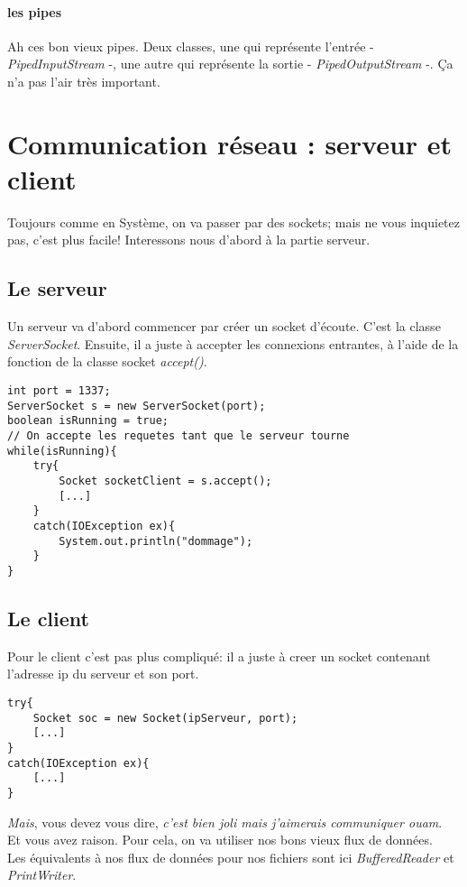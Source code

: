 \documentclass{article}
\begin{document}
\paragraph{les pipes}
Ah ces bon vieux pipes. Deux classes, une qui représente l'entrée - \emph{PipedInputStream} -, une autre qui représente la sortie - \emph{PipedOutputStream} -. Ça n'a pas l'air très important.

\section{Communication réseau : serveur et client}
Toujours comme en Système, on va passer par des sockets; mais ne vous inquietez pas, c'est plus facile! Interessons nous d'abord à la partie serveur.
\subsection{Le serveur}
Un serveur va d'abord commencer par créer un socket d'écoute. C'est la classe \emph{ServerSocket}. Ensuite, il a juste à accepter les connexions entrantes, à l'aide de la fonction de la classe socket \emph{accept()}.\\
\begin{lstlisting}
int port = 1337;
ServerSocket s = new ServerSocket(port);
boolean isRunning = true;
// On accepte les requetes tant que le serveur tourne
while(isRunning){
	try{
		Socket socketClient = s.accept();
		[...]
	}
	catch(IOException ex){
		System.out.println("dommage");
	}
}
\end{lstlisting}

\subsection{Le client}
Pour le client c'est pas plus compliqué: il a juste à creer un socket contenant l'adresse ip du serveur et son port.
\begin{lstlisting}
try{
	Socket soc = new Socket(ipServeur, port);
	[...]
}
catch(IOException ex){
	[...]
}
\end{lstlisting}

\emph{Mais}, vous devez vous dire, \emph{c'est bien joli mais j'aimerais communiquer ouam}.\\
Et vous avez raison. Pour cela, on va utiliser nos bons vieux flux de données.\\
Les équivalents à nos flux de données pour nos fichiers sont ici \emph{BufferedReader} et \emph{PrintWriter}.\\
\end{document}
